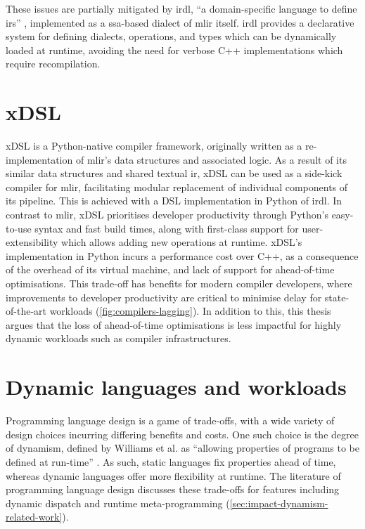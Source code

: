 These issues are partially mitigated by \ac{irdl}, ``a domain-specific language to define \acp{ir}'' \cite{fehrIRDLIRDefinition2022a}, implemented as a \ac{ssa}-based dialect of \ac{mlir} itself.
\ac{irdl} provides a declarative system for defining dialects, operations, and types which can be dynamically loaded at runtime, avoiding the need for verbose C++ implementations which require recompilation.

\section{xDSL}
\label{sec:xdsl}

xDSL is a Python-native compiler framework, originally written as a re-implementation of \ac{mlir}'s data structures and associated logic.
As a result of its similar data structures and shared textual \ac{ir}, xDSL can be used as a side-kick compiler for \ac{mlir}, facilitating modular replacement of individual components of its pipeline. This is achieved with a DSL implementation in Python of \ac{irdl}.
In contrast to \ac{mlir}, xDSL prioritises developer productivity through Python's easy-to-use syntax and fast build times, along with first-class support for user-extensibility which allows adding new operations at runtime. xDSL's implementation in Python incurs a performance cost over C++, as a consequence of the overhead of its virtual machine, and lack of support for ahead-of-time optimisations.
This trade-off has benefits for modern compiler developers, where improvements to developer productivity are critical to minimise delay for state-of-the-art workloads (\autoref{fig:compilers-lagging}). In addition to this, this thesis argues that the loss of ahead-of-time optimisations is less impactful for highly dynamic workloads such as compiler infrastructures.


\section{Dynamic languages and workloads}
\label{sec:static-dynamic-languages}

Programming language design is a game of trade-offs, with a wide variety of design choices incurring differing benefits and costs.
One such choice is the degree of dynamism, defined by Williams et al. as ``allowing properties of programs to be defined at run-time'' \cite{williamsDynamicInterpretationDynamic2010}. As such, static languages fix properties ahead of time, whereas dynamic languages offer more flexibility at runtime.
The literature of programming language design discusses these trade-offs for features including dynamic dispatch and runtime meta-programming (\autoref{sec:impact-dynamism-related-work}).


